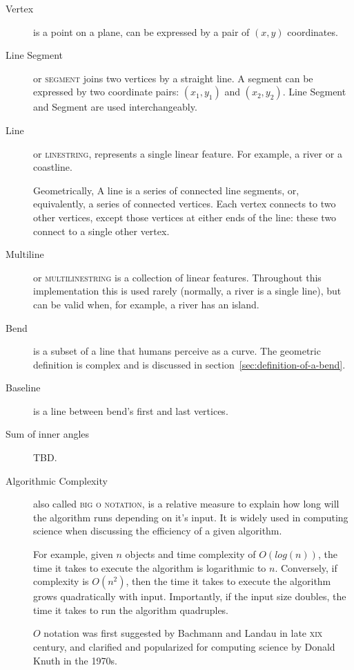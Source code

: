 \documentclass[a4paper]{article}
\begin{document}
\begin{description}

    \item[Vertex] is a point on a plane, can be expressed by a pair of $(x,y)$
        coordinates.

    \item[Line Segment] or \textsc{segment} joins two vertices by a straight
        line. A segment can be expressed by two coordinate pairs: $(x_1, y_1)$
        and $(x_2, y_2)$. Line Segment and Segment are used interchangeably.

    \item[Line] or \textsc{linestring}, represents a single linear feature. For
        example, a river or a coastline.

        Geometrically, A line is a series of connected line segments, or,
        equivalently, a series of connected vertices. Each vertex connects to
        two other vertices, except those vertices at either ends of the line:
        these two connect to a single other vertex.

    \item[Multiline] or \textsc{multilinestring} is a collection of linear
        features. Throughout this implementation this is used rarely (normally,
        a river is a single line), but can be valid when, for example, a river
        has an island.

    \item[Bend] is a subset of a line that humans perceive as a curve. The
        geometric definition is complex and is discussed in
        section~\ref{sec:definition-of-a-bend}.

    \item[Baseline] is a line between bend's first and last vertices.

    \item[Sum of inner angles] TBD.

    \item[Algorithmic Complexity] also called \textsc{big o notation}, is a
        relative measure to explain how long will the algorithm runs depending
        on it's input. It is widely used in computing science when discussing
        the efficiency of a given algorithm.

        For example, given $n$ objects and time complexity of $O(log(n))$, the
        time it takes to execute the algorithm is logarithmic to $n$.
        Conversely, if complexity is $O(n^2)$, then the time it takes to
        execute the algorithm grows quadratically with input. Importantly, if
        the input size doubles, the time it takes to run the algorithm
        quadruples.

        $O$ notation was first suggested by
        Bachmann\cite{bachmann1894analytische} and Landau\cite{landau1911} in
        late \textsc{xix} century, and clarified and popularized for
        computing science by Donald Knuth\cite{knuth1976big} in the 1970s.

\end{description}
\end{document}
